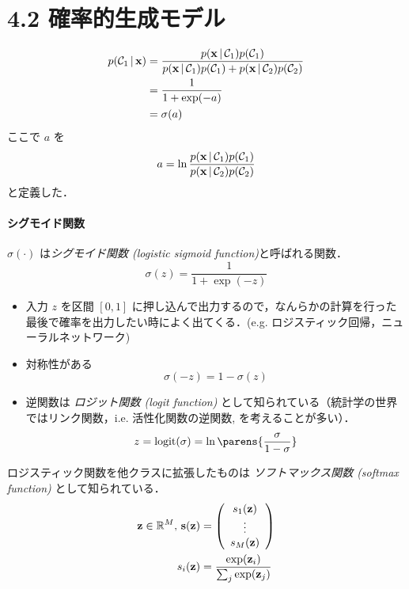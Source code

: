 
\setcounter{section}{4}
\setcounter{equation}{56}
\newcommand{\likpri}[1]{p(\vx\given\cC_{#1})p(\cC_{#1})}

\section*{4.2 確率的生成モデル}


\begin{align}
p(\cC_1\given\vx) & = \frac{\likpri{1}}{\likpri{1} + \likpri{2}} \notag \\
& = \frac{1}{1 + \exp(-a)} \notag \\
& = \sigma(a)
\end{align}
ここで $a$ を
\begin{equation}
  a = \ln \frac{\likpri{1}}{\likpri{2}}
\end{equation}
と定義した．

\paragraph{シグモイド関数}
$\sigma(\cdot)$ は\emph{シグモイド関数 (logistic sigmoid function)}と呼ばれる関数．
\begin{equation}
\sigma(z) = \frac{1}{1 + \exp(-z)}
\end{equation}

\begin{itemize}
  \item 入力 $z$ を区間 $[0, 1]$ に押し込んで出力するので，なんらかの計算を行った最後で確率を出力したい時によく出てくる．(e.g. ロジスティック回帰，ニューラルネットワーク)
  \item 対称性がある
  \begin{equation}
    \sigma(-z) = 1 - \sigma(z)
  \end{equation}
  \item 逆関数は \emph{ロジット関数 (logit function)} として知られている（統計学の世界ではリンク関数，i.e. 活性化関数の逆関数, を考えることが多い）．
  \begin{equation}
    z = \mathrm{logit}(\sigma) = \ln \parens{\frac{\sigma}{1-\sigma}}
  \end{equation}
\end{itemize}

\newpage
ロジスティック関数を他クラスに拡張したものは \emph{ソフトマックス関数 (softmax function)} として知られている．
\begin{align*}
  {\mathbf{z}} \in \mathbb{R}^M,\, {\mathbf{s}}({\mathbf{z}}) & = \left(\begin{array}{c}
    s_1({\mathbf{z}}) \\
    \vdots \\
    s_{M}({\mathbf{z}})
    \end{array}\right) \\
  s_i({\mathbf{z}}) & = \frac{\exp({\mathbf{z}}_i)}{\sum_j \exp({\mathbf{z}}_j)}
\end{align*}

